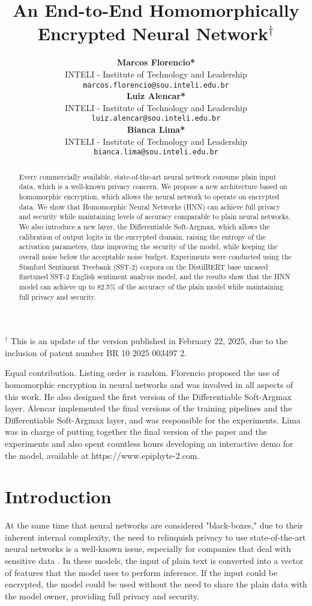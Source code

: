\documentclass{article}
\title{An End-to-End Homomorphically Encrypted Neural Network$^{\dagger}$ \vspace{10mm}}
\author{
    \begin{minipage}{0.3\textwidth} \centering
        \textbf{\small Marcos Florencio*} \\  
         \vspace{-0.5em}
        \scriptsize INTELI - Institute of Technology and Leadership \\  
        \texttt{\tiny marcos.florencio@sou.inteli.edu.br}
    \end{minipage}
    \hfill
    \begin{minipage}{0.3\textwidth} \centering
        \textbf{\small Luiz Alencar*} \\  
         \vspace{-0.5em}
        \scriptsize INTELI - Institute of Technology and Leadership \\  
        \texttt{\tiny luiz.alencar@sou.inteli.edu.br}
    \end{minipage}
    \hfill
    \begin{minipage}{0.3\textwidth} \centering
        \textbf{\small Bianca Lima*} \\ 
         \vspace{-0.5em}
        \scriptsize INTELI - Institute of Technology and Leadership \\  
        \texttt{\tiny bianca.lima@sou.inteli.edu.br}
    \end{minipage}
}
\date{}
\begin{document}
\maketitle

\begin{abstract}
Every commercially available, state-of-the-art neural network consume plain input data, which is a well-known privacy concern. We propose a new architecture based on homomorphic encryption, which allows the neural network to operate on encrypted data. We show that Homomorphic Neural Networks (HNN) can achieve full privacy and security while maintaining levels of accuracy comparable to plain neural networks. We also introduce a new layer, the Differentiable Soft-Argmax, which allows the calibration of output logits in the encrypted domain, raising the entropy of the activation parameters, thus improving the security of the model, while keeping the overall noise below the acceptable noise budget. Experiments were conducted using the Stanford Sentiment Treebank (SST-2) corpora on the DistilBERT base uncased finetuned SST-2 English sentiment analysis model, and the results show that the HNN model can achieve up to 82.5\% of the accuracy of the plain model while maintaining full privacy and security.
\end{abstract}

\vspace{25mm}

{\scriptsize$^{\dagger}$ 
This is an update of the version published in February 22, 2025, due to the inclusion of patent number BR 10 2025 003497 2.}


{\scriptsize*Equal contribution. Listing order is random. Florencio proposed the use of homomorphic encryption in neural networks and was involved in all aspects of this work. He also designed the first version of the Differentiable Soft-Argmax layer. Alencar implemented the final versions of the training pipelines and the Differentiable Soft-Argmax layer, and was responsible for the experiments. Lima was in charge of putting together the final version of the paper and the experiments and also spent countless hours developing an interactive demo for the model, available at https://www.epiphyte-2.com.}
\vspace{20mm}

\section{Introduction}


At the same time that neural networks are considered "black-boxes," due to their inherent internal complexity, the need to relinquish privacy to use state-of-the-art neural networks is a well-known issue, especially for companies that deal with sensitive data \cite{buhrmester2021analysis,savage2022breaking}. In these models, the input of plain text is converted into a vector of features that the model uses to perform inference. If the input could be encrypted, the model could be used without the need to share the plain data with the model owner, providing full privacy and security.
\end{document}
